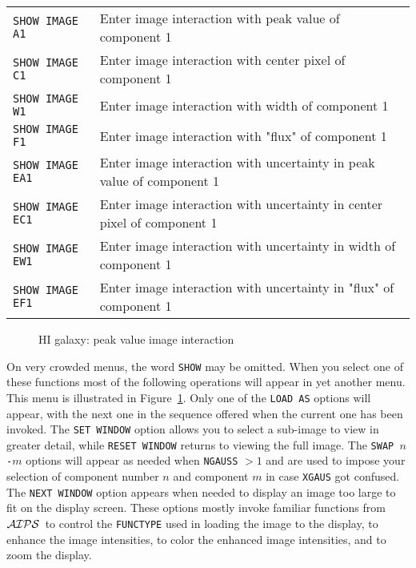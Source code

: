 \documentclass[twoside]{article}
\newcommand{\Me}[1]{\textcolor{mecol}{#1}}
\newcommand{\AIPS}{{$\cal AIPS\/$}}
\newcommand{\putfig}[1]{\texttt{[image: \#1.eps]}}
\begin{document}
\begin{center}
\begin{tabular}{|l|l|}\hline
 {\tt SHOW IMAGE A1 } & Enter image interaction with peak value of
                     component 1\\
 {\tt SHOW IMAGE C1 } & Enter image interaction with center pixel of
                     component 1\\
 {\tt SHOW IMAGE W1 } & Enter image interaction with width of
                     component 1\\
 {\tt SHOW IMAGE F1 } & Enter image interaction with "flux" of
                     component 1\\
 {\tt SHOW IMAGE EA1} & Enter image interaction with uncertainty in
                     peak value of component 1\\
 {\tt SHOW IMAGE EC1} & Enter image interaction with uncertainty in
                     center pixel of component 1\\
 {\tt SHOW IMAGE EW1} & Enter image interaction with uncertainty in
                     width of component 1\\
 {\tt SHOW IMAGE EF1} & Enter image interaction with uncertainty in
                     "flux" of component 1\\ \hline
\end{tabular}
\end{center}

\begin{figure}
\begin{center}
\resizebox{6.0in}{!}{\putfig{XGAUS.HIpeak}}
\caption{HI galaxy: peak value image interaction}
\label{fig:XGAUS.HIpeak}
\end{center}
\end{figure}

On very crowded menus, the word {\tt SHOW} may be omitted.  When you
select one of these functions most of the following operations will
appear in yet another menu.  This menu is illustrated in
Figure~\ref{fig:XGAUS.HIpeak}.  Only one of the {\tt LOAD AS} options
will appear, with the next one in the sequence offered when the
current one has been invoked.  \Me{The {\tt SET WINDOW} option allows
you to select a sub-image to view in greater detail, while {\tt RESET
WINDOW} returns to viewing the full image.}  The {\tt SWAP $n$-$m$}
options will appear as needed when {\tt NGAUSS} $ > 1$ and are used to
impose your selection of component number $n$ and component $m$ in
case {\tt XGAUS} got confused.  The {\tt NEXT WINDOW} option appears
when needed to display an image too large to fit on the display
screen.  These options mostly invoke familiar functions from \AIPS\ to
control the {\tt FUNCTYPE} used in loading the image to the display,
to enhance the image intensities, to color the enhanced image
intensities, and to zoom the display.
\end{document}
